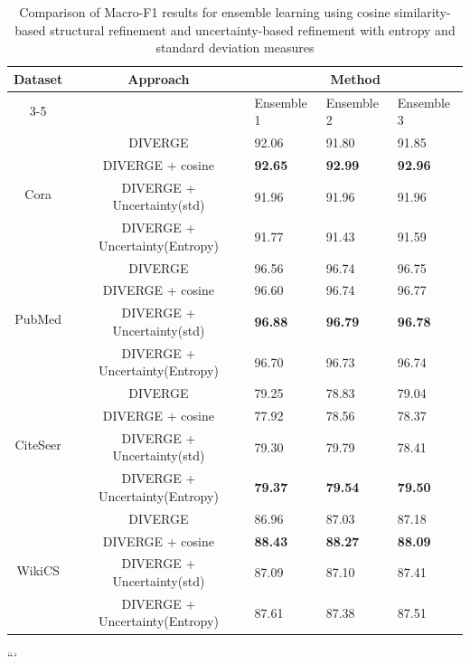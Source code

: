 \documentclass{article}
\begin{document}
\begin{table}[ht]
\centering
\caption{Comparison of Macro-F1 results for ensemble learning using cosine similarity-based structural refinement and uncertainty-based refinement with entropy and standard deviation measures}
\label{tab:macro_f1_ensemble_after_enhancers}
\begin{tabularx}{\linewidth}{c c || *{3}{X}}
\hline
Dataset &
Approach &
\multicolumn{3}{c}{Method} \\
\cline{3-5}
 &  & Ensemble 1 & Ensemble 2 & Ensemble 3 \\
\hline

\multirow{4}{*}{Cora}
 & DIVERGE & 92.06 & 91.80 & 91.85 \\
\cline{2-5}
 & DIVERGE + cosine & \textbf{92.65} & \textbf{92.99} & \textbf{92.96} \\
\cline{2-5}
 & DIVERGE + Uncertainty(std) & 91.96 & 91.96 & 91.96 \\
\cline{2-5}
 & DIVERGE + Uncertainty(Entropy) & 91.77 & 91.43 & 91.59 \\
\hline
\hline

\multirow{4}{*}{PubMed}
 & DIVERGE & 96.56 & 96.74 & 96.75 \\
\cline{2-5}
 & DIVERGE + cosine & 96.60 & 96.74 & 96.77 \\
\cline{2-5}
 & DIVERGE + Uncertainty(std) & \textbf{96.88} & \textbf{96.79} & \textbf{96.78} \\
\cline{2-5}
 & DIVERGE + Uncertainty(Entropy) & 96.70 & 96.73 & 96.74 \\
\hline
\hline

\multirow{4}{*}{CiteSeer}
 & DIVERGE & 79.25 & 78.83 & 79.04 \\
\cline{2-5}
 & DIVERGE + cosine & 77.92 & 78.56 & 78.37 \\
\cline{2-5}
 & DIVERGE + Uncertainty(std) & 79.30 & 79.79 & 78.41 \\
\cline{2-5}
 & DIVERGE + Uncertainty(Entropy) & \textbf{79.37} & \textbf{79.54} & \textbf{79.50} \\
\hline
\hline

\multirow{4}{*}{WikiCS}
 & DIVERGE & 86.96 & 87.03 & 87.18 \\
\cline{2-5}
 & DIVERGE + cosine & \textbf{88.43} & \textbf{88.27} & \textbf{88.09} \\
\cline{2-5}
 & DIVERGE + Uncertainty(std) & 87.09 & 87.10 & 87.41 \\
\cline{2-5}
 & DIVERGE + Uncertainty(Entropy) & 87.61 & 87.38 & 87.51 \\
\hline
\end{tabularx}
\end{table}
```
\end{document}
